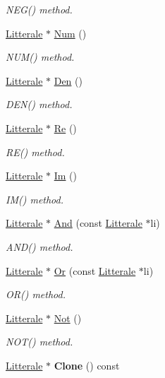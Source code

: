\begin{DoxyCompactItemize}
\begin{DoxyCompactList}\small\item\em N\+E\+G() method. \end{DoxyCompactList}\item 
\hyperlink{class_litterale}{Litterale} $\ast$ \hyperlink{class_li_complexe_a7068b0171c0e0efb6ba803247f1aceca}{Num} ()
\begin{DoxyCompactList}\small\item\em N\+U\+M() method. \end{DoxyCompactList}\item 
\hyperlink{class_litterale}{Litterale} $\ast$ \hyperlink{class_li_complexe_aa4f828dac7bc5fbea088a289719943b6}{Den} ()
\begin{DoxyCompactList}\small\item\em D\+E\+N() method. \end{DoxyCompactList}\item 
\hyperlink{class_litterale}{Litterale} $\ast$ \hyperlink{class_li_complexe_ad93d70af2512c0e835c29677c12c419a}{Re} ()
\begin{DoxyCompactList}\small\item\em R\+E() method. \end{DoxyCompactList}\item 
\hyperlink{class_litterale}{Litterale} $\ast$ \hyperlink{class_li_complexe_a57082c43306e5d43c69d037723d646e7}{Im} ()
\begin{DoxyCompactList}\small\item\em I\+M() method. \end{DoxyCompactList}\item 
\hyperlink{class_litterale}{Litterale} $\ast$ \hyperlink{class_li_complexe_acf2840a901081b436f43045660d14362}{And} (const \hyperlink{class_litterale}{Litterale} $\ast$li)
\begin{DoxyCompactList}\small\item\em A\+N\+D() method. \end{DoxyCompactList}\item 
\hyperlink{class_litterale}{Litterale} $\ast$ \hyperlink{class_li_complexe_a4e05098ec1cdc4b6fd8bba10875181dd}{Or} (const \hyperlink{class_litterale}{Litterale} $\ast$li)
\begin{DoxyCompactList}\small\item\em O\+R() method. \end{DoxyCompactList}\item 
\hyperlink{class_litterale}{Litterale} $\ast$ \hyperlink{class_li_complexe_a37011cb1b7e5d4e9a2e22f217eb463f2}{Not} ()
\begin{DoxyCompactList}\small\item\em N\+O\+T() method. \end{DoxyCompactList}\item 
\hyperlink{class_litterale}{Litterale} $\ast$ {\bfseries Clone} () const \hypertarget{class_li_complexe_a0a55a686e7db1523bdbf95e5b146646f}{}\label{class_li_complexe_a0a55a686e7db1523bdbf95e5b146646f}

\end{DoxyCompactItemize}


